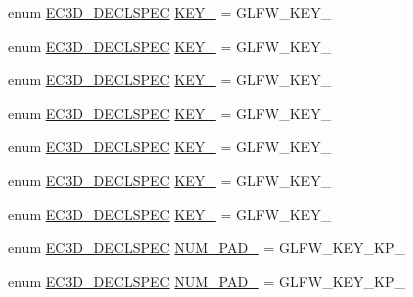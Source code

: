 \begin{DoxyCompactItemize}
\item 
enum \mbox{\hyperlink{_common_8h_aac42573e202ca3dd4d259c81691e2369}{E\+C3\+D\+\_\+\+D\+E\+C\+L\+S\+P\+EC}} \mbox{\hyperlink{classec_1_1_keyboard_a99d867703644def144395a8d141b26b0}{K\+E\+Y\+\_}} = G\+L\+F\+W\+\_\+\+K\+E\+Y\+\_
\item 
enum \mbox{\hyperlink{_common_8h_aac42573e202ca3dd4d259c81691e2369}{E\+C3\+D\+\_\+\+D\+E\+C\+L\+S\+P\+EC}} \mbox{\hyperlink{classec_1_1_keyboard_adfac2e411700401affa8df6153681da6}{K\+E\+Y\+\_}} = G\+L\+F\+W\+\_\+\+K\+E\+Y\+\_
\item 
enum \mbox{\hyperlink{_common_8h_aac42573e202ca3dd4d259c81691e2369}{E\+C3\+D\+\_\+\+D\+E\+C\+L\+S\+P\+EC}} \mbox{\hyperlink{classec_1_1_keyboard_a3ac330b34232272a1c8efa88d31977c4}{K\+E\+Y\+\_}} = G\+L\+F\+W\+\_\+\+K\+E\+Y\+\_
\item 
enum \mbox{\hyperlink{_common_8h_aac42573e202ca3dd4d259c81691e2369}{E\+C3\+D\+\_\+\+D\+E\+C\+L\+S\+P\+EC}} \mbox{\hyperlink{classec_1_1_keyboard_af3637c105dc23dacf0de62d1a286c10f}{K\+E\+Y\+\_}} = G\+L\+F\+W\+\_\+\+K\+E\+Y\+\_
\item 
enum \mbox{\hyperlink{_common_8h_aac42573e202ca3dd4d259c81691e2369}{E\+C3\+D\+\_\+\+D\+E\+C\+L\+S\+P\+EC}} \mbox{\hyperlink{classec_1_1_keyboard_a2ce1aa1beb0123b243b1a4e5a6c8b5b6}{K\+E\+Y\+\_}} = G\+L\+F\+W\+\_\+\+K\+E\+Y\+\_
\item 
enum \mbox{\hyperlink{_common_8h_aac42573e202ca3dd4d259c81691e2369}{E\+C3\+D\+\_\+\+D\+E\+C\+L\+S\+P\+EC}} \mbox{\hyperlink{classec_1_1_keyboard_ace0785fe5a1e11023c7a7cfa9791c527}{K\+E\+Y\+\_}} = G\+L\+F\+W\+\_\+\+K\+E\+Y\+\_
\item 
enum \mbox{\hyperlink{_common_8h_aac42573e202ca3dd4d259c81691e2369}{E\+C3\+D\+\_\+\+D\+E\+C\+L\+S\+P\+EC}} \mbox{\hyperlink{classec_1_1_keyboard_a69b51ba3fb41b7b5afde5e3f3bab4f9c}{K\+E\+Y\+\_}} = G\+L\+F\+W\+\_\+\+K\+E\+Y\+\_
\item 
enum \mbox{\hyperlink{_common_8h_aac42573e202ca3dd4d259c81691e2369}{E\+C3\+D\+\_\+\+D\+E\+C\+L\+S\+P\+EC}} \mbox{\hyperlink{classec_1_1_keyboard_a2b29fb796ac7f5ae647dd636a796a91d}{N\+U\+M\+\_\+\+P\+A\+D\+\_}} = G\+L\+F\+W\+\_\+\+K\+E\+Y\+\_\+\+K\+P\+\_
\item 
enum \mbox{\hyperlink{_common_8h_aac42573e202ca3dd4d259c81691e2369}{E\+C3\+D\+\_\+\+D\+E\+C\+L\+S\+P\+EC}} \mbox{\hyperlink{classec_1_1_keyboard_a36b3b138bb5132950f91956e5c0a9676}{N\+U\+M\+\_\+\+P\+A\+D\+\_}} = G\+L\+F\+W\+\_\+\+K\+E\+Y\+\_\+\+K\+P\+\_
\item 

\end{DoxyCompactItemize}
